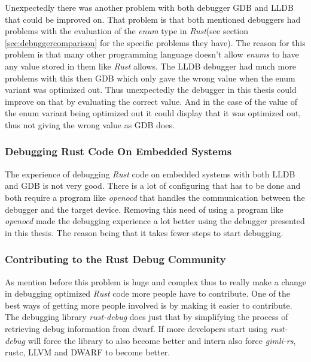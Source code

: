 Unexpectedly there was another problem with both debugger \gls{GDB} and \gls{LLDB} that could be improved on.
That problem is that both mentioned debuggers had problems with the evaluation of the \emph{enum} type in \emph{Rust}(see section \ref{sec:debuggercomparison} for the specific problems they have).
The reason for this problem is that many other programming language doesn't allow \emph{enums} to have any value stored in them like \emph{Rust} allows.
The \gls{LLDB} debugger had much more problems with this then \gls{GDB} which only gave the wrong value when the enum variant was optimized out.
Thus unexpectedly the debugger in this thesis could improve on that by evaluating the correct value.
And in the case of the value of the  enum variant being optimized out it could display that it was optimized out, thus not giving the wrong value as \gls{GDB} does.


\subsubsection{Debugging Rust Code On Embedded Systems}
The experience of debugging \emph{Rust} code on embedded systems with both \gls{LLDB} and \gls{GDB} is not very good.
There is a lot of configuring that has to be done and both require a program like \emph{openocd} that handles the communication between the debugger and the target device.
Removing this need of using a program like \emph{openocd} made the debugging experience a lot better using the debugger presented in this thesis.
The reason being that it takes fewer steps to start debugging.


\subsubsection{Contributing to the Rust Debug Community}
As mention before this problem is huge and complex thus to really make a change in debugging optimized \emph{Rust} code more people have to contribute.
One of the best ways of getting more people involved is by making it easier to contribute.
The debugging library \emph{rust-debug} does just that by simplifying the process of retrieving debug information from dwarf.
If more developers start using \emph{rust-debug} will force the library to also become better and intern also force \emph{gimli-rs}, \gls{rustc}, \gls{LLVM} and \gls{DWARF} to become better.

